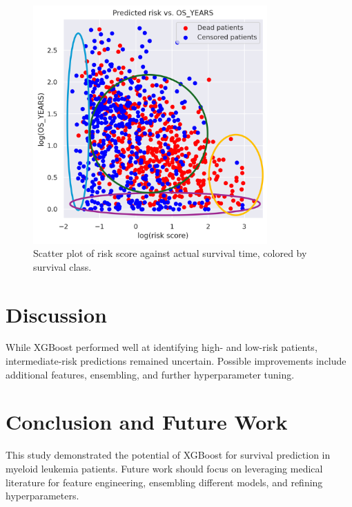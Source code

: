 \documentclass{article}
\begin{document}
\begin{figure}[h]
    \centering
    \includegraphics[width=0.8\textwidth]{img/risk_score_vs_OS_YEARS_annotated.png}
    \caption{Scatter plot of risk score against actual survival time, colored by survival class.}
    \label{fig:precision_recall}
\end{figure}


\section{Discussion}
While XGBoost performed well at identifying high- and low-risk patients, intermediate-risk predictions remained uncertain. Possible improvements include additional features, ensembling, and further hyperparameter tuning.

\section{Conclusion and Future Work}
This study demonstrated the potential of XGBoost for survival prediction in myeloid leukemia patients. Future work should focus on leveraging medical literature for feature engineering, ensembling different models, and refining hyperparameters.
\end{document}
